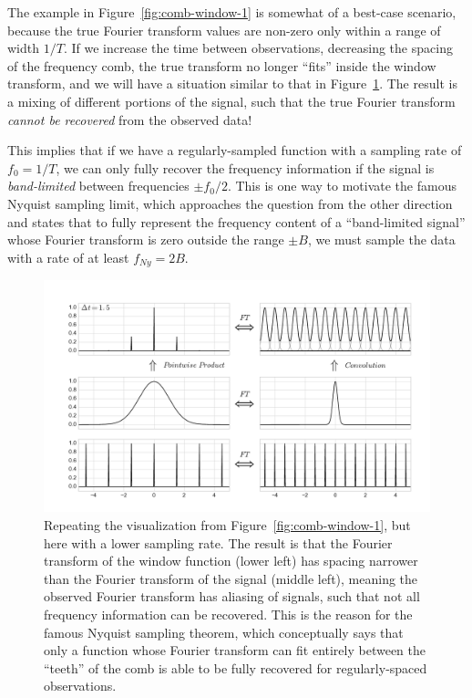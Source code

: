 \documentclass[preprint]{aastex}
\newcommand{\fig}[1]{Figure~\ref{fig:#1}}
\newcommand{\figlabel}[1]{\label{fig:#1}}
\begin{document}
The example in \fig{comb-window-1} is somewhat of a best-case scenario, because
the true Fourier transform values are non-zero only within a range of
width $1/T$.
If we increase the time between observations, decreasing the spacing of the
frequency comb, the true transform no longer ``fits'' inside the window
transform, and we will have a situation similar to that in \fig{comb-window-2}.
The result is a mixing of different portions of the signal, such that
the true Fourier transform {\it cannot be recovered}
from the observed data!

This implies that if we have a regularly-sampled function with a sampling
rate of $f_0 = 1/T$, we can only fully recover the frequency information
if the signal is {\it band-limited} between frequencies $\pm f_0/2$.
This is one way to motivate the famous Nyquist sampling limit, which
approaches the question from the other direction and states
that to fully represent the frequency content of a ``band-limited signal''
whose Fourier transform is zero outside the range $\pm B$,
we must sample the data with a rate of at least $f_{Ny} = 2B$.

\begin{figure}[ht]
  \centering
  \includegraphics[width=\textwidth]{fig08_comb_window_2}
  \caption{Repeating the visualization from \fig{comb-window-1}, but here with
    a lower sampling rate. The result is that the Fourier transform of the
    window function (lower left) has spacing narrower than the Fourier transform
    of the signal (middle left), meaning the observed Fourier transform has
    aliasing of signals, such that not all frequency information can be
    recovered. This is the reason for the famous Nyquist sampling theorem,
    which conceptually says that only a function whose Fourier transform can
    fit entirely between the ``teeth'' of the comb is able to be fully
    recovered for regularly-spaced observations.
    \figlabel{comb-window-2}}
\end{figure}
\end{document}
